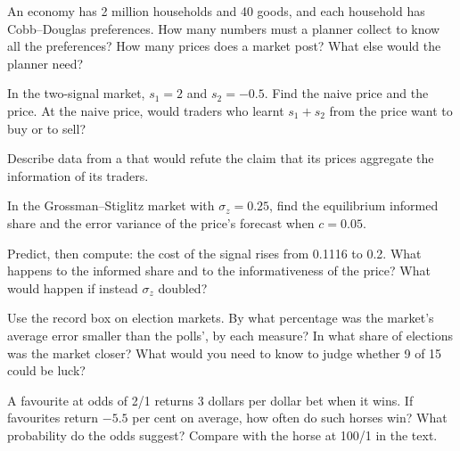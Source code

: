 \begin{exercise}[$\star$]\label{exo:b2:prices-as-information:2}
An economy has 2 million households and 40 goods, and each household has Cobb--Douglas preferences. How
many numbers must a planner collect to know all the preferences? How many prices does a market post?
What else would the planner need?
\end{exercise}

\begin{exercise}[$\star$]\label{exo:b2:prices-as-information:3}
In the two-signal market, $s_1 = 2$ and $s_2 = -0.5$. Find the naive price and the  price.
At the naive price, would traders who learnt $s_1 + s_2$ from the price want to buy or to sell?
\end{exercise}

\begin{exercise}[$\star$]\label{exo:b2:prices-as-information:4}
Describe data from a  that would refute the claim that its prices aggregate the
information of its traders.
\end{exercise}

\begin{exercise}[$\star\star$]\label{exo:b2:prices-as-information:5}
In the Grossman--Stiglitz market with $\sigma_z = 0.25$, find the equilibrium informed share and the
error variance of the price's forecast when $c = 0.05$.
\end{exercise}

\begin{exercise}[$\star\star$]\label{exo:b2:prices-as-information:6}
Predict, then compute: the cost of the signal rises from 0.1116 to 0.2. What happens to the informed share
and to the informativeness of the price? What would happen if instead $\sigma_z$ doubled?
\end{exercise}

\begin{exercise}[$\star\star$]\label{exo:b2:prices-as-information:7}
Use the record box on election markets. By what percentage was the market's average error smaller than the
polls', by each measure? In what share of elections was the market closer? What would you need to know to
judge whether 9 of 15 could be luck?
\end{exercise}

\begin{exercise}[$\star\star$]\label{exo:b2:prices-as-information:8}
A favourite at odds of 2/1 returns 3 dollars per dollar bet when it wins. If favourites return $-5.5$ per
cent on average, how often do such horses win? What probability do the odds suggest? Compare with the
horse at 100/1 in the text.
\end{exercise}


